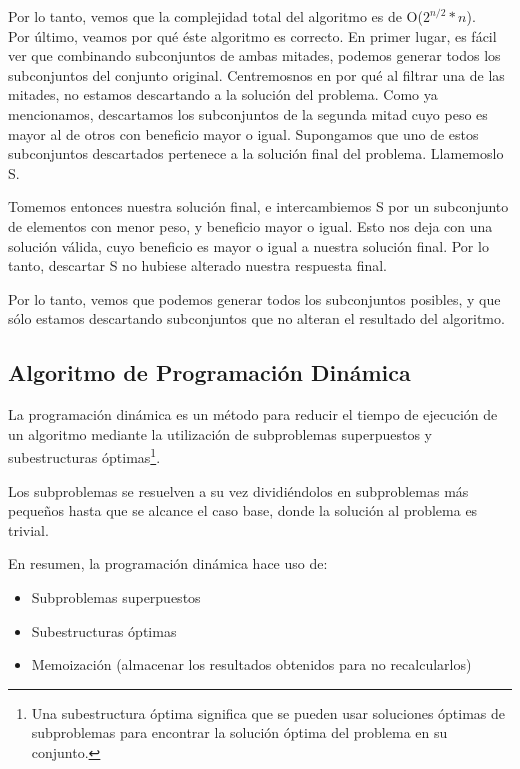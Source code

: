 \bigskip

Por lo tanto, vemos que la complejidad total del algoritmo es de O($2^{n/2} * n$). \\

Por último, veamos por qué éste algoritmo es correcto. En primer lugar, es fácil ver que combinando subconjuntos de ambas mitades, podemos generar todos los subconjuntos del conjunto original. Centremosnos en por qué al filtrar una de las mitades, no estamos descartando a la solución del problema. Como ya mencionamos, descartamos los subconjuntos de la segunda mitad cuyo peso es mayor al de otros con beneficio mayor o igual. Supongamos que uno de estos subconjuntos descartados pertenece a la solución final del problema. Llamemoslo S.

Tomemos entonces nuestra solución final, e intercambiemos S por un subconjunto de elementos con menor peso, y beneficio mayor o igual. Esto nos deja con una solución válida, cuyo beneficio es mayor o igual a nuestra solución final. Por lo tanto, descartar S no hubiese alterado nuestra respuesta final.

Por lo tanto, vemos que podemos generar todos los subconjuntos posibles, y que sólo estamos descartando subconjuntos que no alteran el resultado del algoritmo.

\subsection{Algoritmo de Programación Dinámica}
La programación dinámica es un método para reducir el tiempo de ejecución de un algoritmo mediante la utilización de subproblemas superpuestos y subestructuras óptimas\footnote{Una subestructura óptima significa que se pueden usar soluciones óptimas de subproblemas para encontrar la solución óptima del problema en su conjunto.}.

Los subproblemas se resuelven a su vez dividiéndolos en subproblemas más pequeños hasta que se alcance el caso base, donde la solución al problema es trivial.


En resumen, la programación dinámica hace uso de:
\begin{itemize}
	\item Subproblemas superpuestos
	\item Subestructuras óptimas
	\item Memoización (almacenar los resultados obtenidos para no recalcularlos)
\end{itemize}


